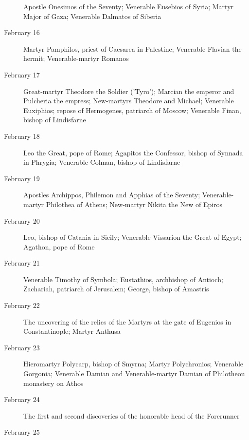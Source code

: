 \begin{description}
Apostle Onesimos of the Seventy; Venerable Eusebios of Syria; Martyr Major of Gaza; Venerable Dalmatos of Siberia

\item[February 16]

Martyr Pamphilos, priest of Caesarea in Palestine; Venerable Flavian the hermit; Venerable-martyr Romanos

\item[February 17]

Great-martyr Theodore the Soldier ('Tyro'); Marcian the emperor and Pulcheria the empress; New-martyrs Theodore and Michael; Venerable Euxiphios; repose of Hermogenes, patriarch of Moscow; Venerable Finan, bishop of Lindisfarne

\item[February 18]

Leo the Great, pope of Rome; Agapitos the Confessor, bishop of Synnada in Phrygia; Venerable Colman, bishop of Lindisfarne

\item[February 19]

Apostles Archippos, Philemon and Apphias of the Seventy; Venerable-martyr Philothea of Athens; New-martyr Nikita the New of Epiros

\item[February 20]

Leo, bishop of Catania in Sicily; Venerable Vissarion the Great of Egypt; Agathon, pope of Rome

\item[February 21]

Venerable Timothy of Symbola; Eustathios, archbishop of Antioch; Zachariah, patriarch of Jerusalem; George, bishop of Amastris

\item[February 22]

The uncovering of the relics of the Martyrs at the gate of Eugenios in Constantinople; Martyr Anthusa

\item[February 23]

Hieromartyr Polycarp, bishop of Smyrna; Martyr Polychronios; Venerable Gorgonia; Venerable Damian and Venerable-martyr Damian of Philotheou monastery on Athos

\item[February 24]

The first and second discoveries of the honorable head of the Forerunner

\item[February 25]


\end{description}

